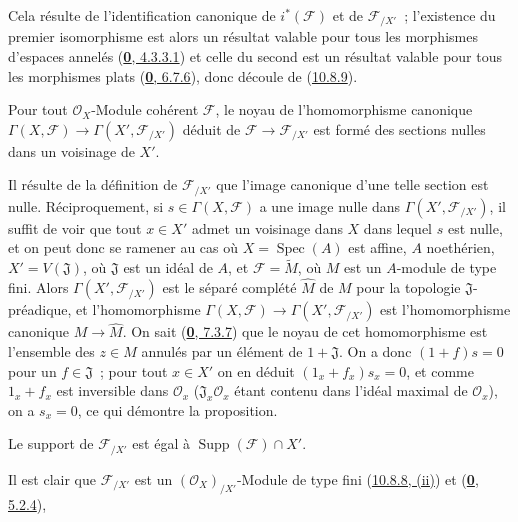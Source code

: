 Cela résulte de l'identification canonique de $i^*(\mathscr{F})$ et de
$\mathscr{F}_{/X'}$~; l'existence du premier isomorphisme est alors un
résultat valable pour tous les morphismes d'espaces annelés
(\hyperref[0.4.3.3.1-fr]{\textbf{0}, 4.3.3.1}) et celle du second est un résultat
valable pour tous les morphismes plats
(\hyperref[0.6.7.6-fr]{\textbf{0}, 6.7.6}), donc découle de
(\hyperref[I.10.8.9-fr]{10.8.9}).

\begin{proposition}[10.8.11]
\label{I.10.8.11-fr}
Pour tout $\mathscr{O}_X$-Module cohérent $\mathscr{F}$, le noyau de
l'homomorphisme canonique
$\Gamma(X,\mathscr{F})\to\Gamma(X',\mathscr{F}_{/X'})$ déduit de
$\mathscr{F}\to\mathscr{F}_{/X'}$ est formé des sections nulles dans un
voisinage de $X'$.
\end{proposition}

Il résulte de la définition de $\mathscr{F}_{/X'}$ que l'image canonique
d'une telle section est nulle. Réciproquement, si
$s\in\Gamma(X,\mathscr{F})$ a une image nulle dans
$\Gamma(X',\mathscr{F}_{/X'})$, il suffit de voir que tout $x\in X'$ admet
un voisinage dans $X$ dans lequel $s$ est nulle, et on peut donc se ramener
au cas où $X=\operatorname{Spec}(A)$ est affine, $A$ noethérien,
$X'=V(\mathfrak{J})$, où $\mathfrak{J}$ est un idéal de $A$, et
$\mathscr{F}=\widetilde M$, où $M$ est un $A$-module de type fini. Alors
$\Gamma(X',\mathscr{F}_{/X'})$ est le séparé complété $\widehat M$ de $M$
pour la topologie $\mathfrak{J}$-préadique, et l'homomorphisme
$\Gamma(X,\mathscr{F})\to\Gamma(X',\mathscr{F}_{/X'})$ est
l'homomorphisme canonique $M\to\widehat M$. On sait
(\hyperref[0.7.3.7-fr]{\textbf{0}, 7.3.7}) que le noyau de cet homomorphisme est
l'ensemble des $z\in M$ annulés par un élément de $1+\mathfrak{J}$. On a
donc $(1+f)s=0$ pour un $f\in\mathfrak{J}$~; pour tout $x\in X'$ on en
déduit $(1_x+f_x)s_x=0$, et comme $1_x+f_x$ est inversible dans
$\mathscr{O}_x$ ($\mathfrak{J}_x\mathscr{O}_x$ étant contenu dans l'idéal
maximal de $\mathscr{O}_x$), on a $s_x=0$, ce qui démontre la proposition.

\begin{corollary}[10.8.12]
\label{I.10.8.12-fr}
Le support de $\mathscr{F}_{/X'}$ est égal à
$\operatorname{Supp}(\mathscr{F})\cap X'$.
\end{corollary}

Il est clair que $\mathscr{F}_{/X'}$ est un
$(\mathscr{O}_X)_{/X'}$-Module de type fini
(\hyperref[I.10.8.8-fr]{10.8.8, (ii)}) et
(\hyperref[0.5.2.4-fr]{\textbf{0}, 5.2.4}),

